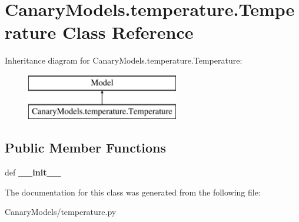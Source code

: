 \hypertarget{class_canary_models_1_1temperature_1_1_temperature}{\section{Canary\-Models.\-temperature.\-Temperature Class Reference}
\label{class_canary_models_1_1temperature_1_1_temperature}
}
Inheritance diagram for Canary\-Models.\-temperature.\-Temperature\-:\begin{figure}[H]
\begin{center}
\leavevmode
\includegraphics[height=2.000000cm]{class_canary_models_1_1temperature_1_1_temperature}
\end{center}
\end{figure}
\subsection*{Public Member Functions}
\begin{DoxyCompactItemize}
\item 
\hypertarget{class_canary_models_1_1temperature_1_1_temperature_a8e50f4e41047d0c974fa36dda48b5c47}{def {\bfseries \-\_\-\-\_\-init\-\_\-\-\_\-}}\label{class_canary_models_1_1temperature_1_1_temperature_a8e50f4e41047d0c974fa36dda48b5c47}

\end{DoxyCompactItemize}


The documentation for this class was generated from the following file\-:\begin{DoxyCompactItemize}
\item 
Canary\-Models/temperature.\-py\end{DoxyCompactItemize}
